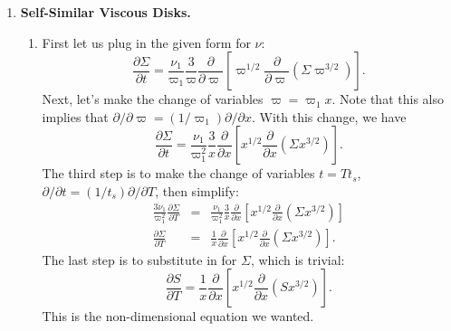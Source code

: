 \begin{enumerate}
\begin{enumerate}
\end{enumerate}

\item \textbf{Self-Similar Viscous Disks.}

\begin{enumerate}

\item First let us plug in the given form for $\nu$:
\begin{displaymath}
\frac{\partial\Sigma}{\partial t} = \frac{\nu_1}{\varpi_1} \frac{3}{\varpi} \frac{\partial}{\partial \varpi} \left[\varpi^{1/2} \frac{\partial}{\partial \varpi} \left(\Sigma \varpi^{3/2}\right)\right].
\end{displaymath}
Next, let's make the change of variables $\varpi = \varpi_1 x$. Note that this also implies that $\partial /\partial \varpi = (1/\varpi_1) \partial/\partial x$. With this change, we have
\begin{displaymath}
\frac{\partial\Sigma}{\partial t} = \frac{\nu_1}{\varpi_1^2} \frac{3}{x} \frac{\partial}{\partial x} \left[x^{1/2} \frac{\partial}{\partial x} \left(\Sigma x^{3/2}\right)\right].
\end{displaymath}
The third step is to make the change of variables $t = T t_s$, $\partial/\partial t = (1/t_s) \partial/\partial T$, then simplify:
\begin{eqnarray*}
\frac{3\nu_1}{\varpi_1^2} \frac{\partial\Sigma}{\partial T} & = & \frac{\nu_1}{\varpi_1^2} \frac{3}{x} \frac{\partial}{\partial x} \left[x^{1/2} \frac{\partial}{\partial x} \left(\Sigma x^{3/2}\right)\right] \\
\frac{\partial\Sigma}{\partial T} & = & \frac{1}{x} \frac{\partial}{\partial x} \left[x^{1/2} \frac{\partial}{\partial x} \left(\Sigma x^{3/2}\right)\right].
\end{eqnarray*}
The last step is to substitute in for $\Sigma$, which is trivial:
\begin{displaymath}
\frac{\partial S}{\partial T} = \frac{1}{x} \frac{\partial}{\partial x} \left[x^{1/2} \frac{\partial}{\partial x} \left(S x^{3/2}\right)\right].
\end{displaymath}
This is the non-dimensional equation we wanted.


\end{enumerate}
\end{enumerate}
